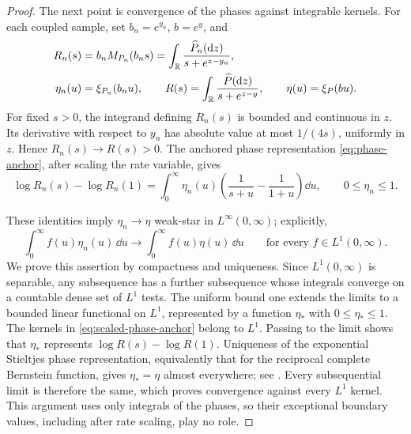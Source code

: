 \begin{proof}
The next point is convergence of the phases against integrable kernels.
For each coupled sample, set \(b_n=e^{y_n}\), \(b=e^y\), and
\begin{equation}
 \begin{split}
 R_n(s)&=b_nM_{P_n}(b_ns)
       =\int_{\mathbb R}\frac{\widehat P_n(\mathop{}\!\mathrm d z)}
                           {s+e^{z-y_n}},\\
 \eta_n(u)&=\xi_{P_n}(b_nu),\qquad
 R(s)=\int_{\mathbb R}\frac{\widehat P(\mathop{}\!\mathrm d z)}
                         {s+e^{z-y}},\qquad
 \eta(u)=\xi_P(bu).
 \end{split}
 \label{eq:scaled-posterior-transform}
\end{equation}
For fixed \(s>0\), the integrand defining \(R_n(s)\) is bounded and continuous in \(z\).
Its derivative with respect to \(y_n\) has absolute value at most \(1/(4s)\), uniformly in \(z\).
Hence \(R_n(s)\to R(s)>0\).
The anchored phase representation \eqref{eq:phase-anchor}, after scaling the rate variable, gives
\begin{equation}
 \log R_n(s)-\log R_n(1)
   =\int_0^\infty\eta_n(u)
       \left(\frac1{s+u}-\frac1{1+u}\right)\dd u,
 \qquad 0\le\eta_n\le1.
 \label{eq:scaled-phase-anchor}
\end{equation}

These identities imply \(\eta_n\to\eta\) weak-star in \(L^\infty(0,\infty)\); explicitly,
\[
 \int_0^\infty f(u)\eta_n(u)\,\dd u
 \longrightarrow\int_0^\infty f(u)\eta(u)\,\dd u
 \qquad\text{for every }f\in L^1(0,\infty).
\]
We prove this assertion by compactness and uniqueness.
Since \(L^1(0,\infty)\) is separable, any subsequence has a further subsequence whose integrals converge on a countable dense set of \(L^1\) tests.
The uniform bound one extends the limits to a bounded linear functional on \(L^1\), represented by a function \(\eta_*\) with \(0\le\eta_*\le1\).
The kernels in \eqref{eq:scaled-phase-anchor} belong to \(L^1\).
Passing to the limit shows that \(\eta_*\) represents \(\log R(s)-\log R(1)\).
Uniqueness of the exponential Stieltjes phase representation, equivalently that for the reciprocal complete Bernstein function, gives \(\eta_*=\eta\) almost everywhere; see \cite[Theorems~6.10 and~7.3]{SSV2010}.
Every subsequential limit is therefore the same, which proves convergence against every \(L^1\) kernel.
This argument uses only integrals of the phases, so their exceptional boundary values, including after rate scaling, play no role.


\end{proof}
